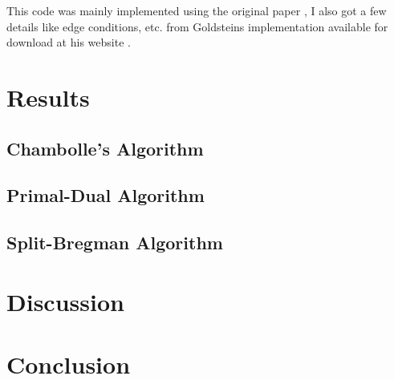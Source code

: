 \documentclass[11pt]{article}
\begin{document}
This code was mainly implemented using the original paper \cite{goldstein2009split}, I also got a few details like edge conditions, etc. from Goldsteins implementation available for download at his website \cite{goldsteinImplmentation}.

\section{Results}
\subsection{Chambolle's Algorithm}
\subsection{Primal-Dual Algorithm}
\subsection{Split-Bregman Algorithm}

\section{Discussion}

\section{Conclusion}


\end{document}
